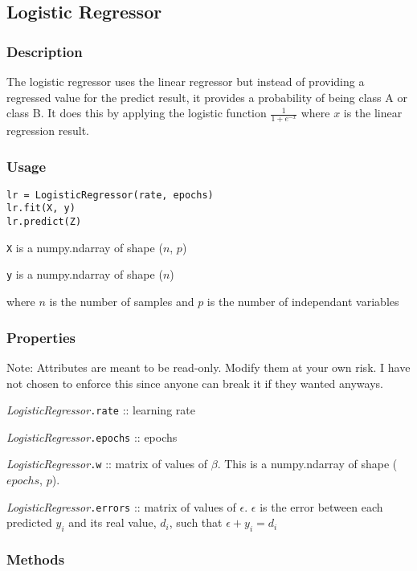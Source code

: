 \documentclass{article}
\begin{document}
\subsection{Logistic Regressor}

\subsubsection{Description}

The logistic regressor uses the linear regressor but instead of providing a
regressed value for the predict result, it provides a probability of being class
A or class B. It does this by applying the logistic function
$\frac{1}{1+e^{-x}}$ where $x$ is the linear regression result.

\subsubsection{Usage}

\begin{verbatim}
lr = LogisticRegressor(rate, epochs)
lr.fit(X, y)
lr.predict(Z)
\end{verbatim}

\texttt{X} is a numpy.ndarray of shape ($n$, $p$)

\texttt{y} is a numpy.ndarray of shape ($n$)

where $n$ is the number of samples and $p$ is the number of independant
variables

\subsubsection{Properties}

Note: Attributes are meant to be read-only. Modify them at your own risk. I have
not chosen to enforce this since anyone can break it if they wanted anyways.

\textit{LogisticRegressor}\texttt{.rate} :: learning rate

\textit{LogisticRegressor}\texttt{.epochs} :: epochs

\textit{LogisticRegressor}\texttt{.w} :: matrix of values of $\beta$. This is a
numpy.ndarray of shape ($epochs$, $p$).

\textit{LogisticRegressor}\texttt{.errors} :: matrix of values of $\epsilon$.
$\epsilon$ is the error between each predicted $y_i$ and its real value, $d_i$,
such that $\epsilon + y_i = d_i$

\subsubsection{Methods}
\end{document}
